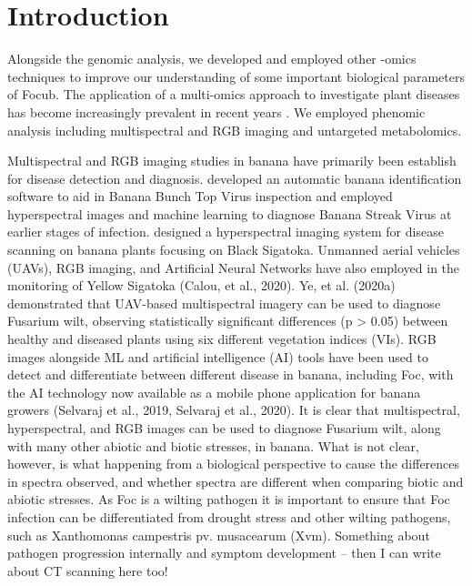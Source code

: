 
\section{Introduction}

Alongside the genomic analysis, we developed and employed other -omics techniques to improve our understanding of some important biological parameters of \ac{Focub}. The application of  a multi-omics approach to investigate plant diseases has become increasingly prevalent in recent years \parencite{Crandall2020}. We employed phenomic analysis including multispectral and RGB imaging and untargeted metabolomics. 

Multispectral and RGB imaging studies in banana have primarily been establish for disease detection and diagnosis. \textcite{Johansen2014} developed an automatic banana identification software to aid in Banana Bunch Top Virus inspection and \textcite{Liao2018} employed hyperspectral images and machine learning to diagnose Banana Streak Virus at earlier stages of infection. \textcite{Ochoa2016} designed a hyperspectral imaging system for disease scanning on banana plants focusing on Black Sigatoka. Unmanned aerial vehicles (UAVs), RGB imaging, and Artificial Neural Networks have also employed in the monitoring of Yellow Sigatoka (Calou, et al., 2020). Ye, et al. (2020a) demonstrated that UAV-based multispectral imagery can be used to diagnose Fusarium wilt, observing statistically significant differences (p > 0.05) between healthy and diseased plants using six different vegetation indices (VIs). RGB images alongside ML and artificial intelligence (AI) tools have been used to detect and differentiate between different disease in banana, including Foc, with the AI technology now available as a mobile phone application for banana growers (Selvaraj et al., 2019, Selvaraj et al., 2020).
It is clear that multispectral, hyperspectral, and RGB images can be used to diagnose Fusarium wilt, along with many other abiotic and biotic stresses, in banana. What is not clear, however, is what happening from a biological perspective to cause the differences in spectra observed, and whether spectra are different when comparing biotic and abiotic stresses. As Foc is a wilting pathogen it is important to ensure that Foc infection can be differentiated from drought stress and other wilting pathogens, such as Xanthomonas campestris pv. musacearum (Xvm). 
Something about pathogen progression internally and symptom development – then I can write about CT scanning here too!




